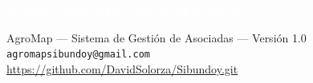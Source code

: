 \documentclass[12pt]{article}
\begin{document}
\vfill
\begin{center}
\begin{tcolorbox}[colback=primary!90, colframe=primary, arc=8pt, width=0.6\textwidth, center]
  \centering\textcolor{white}{\large\textbf{Software desarrollado por WolfEnterprise}}
\end{tcolorbox}
\vspace{0.5cm}
{\small AgroMap --- Sistema de Gesti\'on de Asociadas --- Versi\'on 1.0}\\[0.3cm]
{\small \texttt{agromapsibundoy@gmail.com}}\\[0.3cm]
{\small \url{https://github.com/DavidSolorza/Sibundoy.git}}
\end{center}
\end{document}
